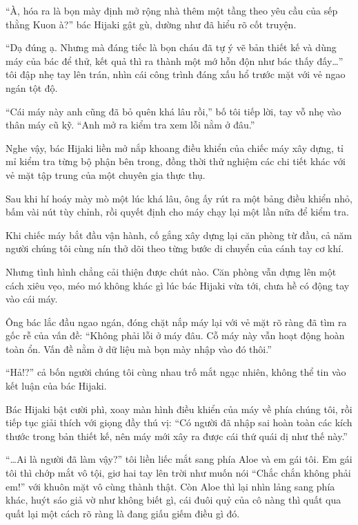 \documentclass[../main.tex]{subfiles}
\begin{document}
``À, hóa ra là bọn mày định mở rộng nhà thêm một tầng theo yêu cầu của sếp thằng Kuon à?'' bác Hijaki gật gù, dường như đã hiểu rõ cốt truyện.

``Dạ đúng ạ. Nhưng mà đáng tiếc là bọn cháu đã tự ý vẽ bản thiết kế và dùng máy của bác để thử, kết quả thì ra thành một mớ hỗn độn như bác thấy đấy\dots'' tôi đập nhẹ tay lên trán, nhìn cái công trình đáng xấu hổ trước mặt với vẻ ngao ngán tột độ.

``Cái máy này anh cũng đã bỏ quên khá lâu rồi,'' bố tôi tiếp lời, tay vỗ nhẹ vào thân máy cũ kỹ. ``Anh mở ra kiểm tra xem lỗi nằm ở đâu.''

Nghe vậy, bác Hijaki liền mở nắp khoang điều khiển của chiếc máy xây dựng, tỉ mỉ kiểm tra từng bộ phận bên trong, đồng thời thử nghiệm các chi tiết khác với vẻ mặt tập trung của một chuyên gia thực thụ.

Sau khi hí hoáy mày mò một lúc khá lâu, ông ấy rút ra một bảng điều khiển nhỏ, bấm vài nút tùy chỉnh, rồi quyết định cho máy chạy lại một lần nữa để kiểm tra.

Khi chiếc máy bắt đầu vận hành, cố gắng xây dựng lại căn phòng từ đầu, cả năm người chúng tôi cùng nín thở dõi theo từng bước di chuyển của cánh tay cơ khí.

Nhưng tình hình chẳng cải thiện được chút nào. Căn phòng vẫn dựng lên một cách xiêu vẹo, méo mó không khác gì lúc bác Hijaki vừa tới, chưa hề có động tay vào cái máy.

Ông bác lắc đầu ngao ngán, đóng chặt nắp máy lại với vẻ mặt rõ ràng đã tìm ra gốc rễ của vấn đề: ``Không phải lỗi ở máy đâu. Cỗ máy này vẫn hoạt động hoàn toàn ổn. Vấn đề nằm ở dữ liệu mà bọn mày nhập vào đó thôi.''

``Hả!?'' cả bốn người chúng tôi cùng nhau trố mắt ngạc nhiên, không thể tin vào kết luận của bác Hijaki.

Bác Hijaki bật cười phì, xoay màn hình điều khiển của máy về phía chúng tôi, rồi tiếp tục giải thích với giọng đầy thú vị: ``Có người đã nhập sai hoàn toàn các kích thước trong bản thiết kế, nên máy mới xây ra được cái thứ quái dị như thế này.''

``\dots Ai là người đã làm vậy?'' tôi liền liếc mắt sang phía Aloe và em gái tôi. Em gái tôi thì chớp mắt vô tội, giơ hai tay lên trời như muốn nói ``Chắc chắn không phải em!'' với khuôn mặt vô cùng thành thật. Còn Aloe thì lại nhìn lảng sang phía khác, huýt sáo giả vờ như không biết gì, cái đuôi quỷ của cô nàng thì quất qua quất lại một cách rõ ràng là đang giấu giếm điều gì đó.
\end{document}
